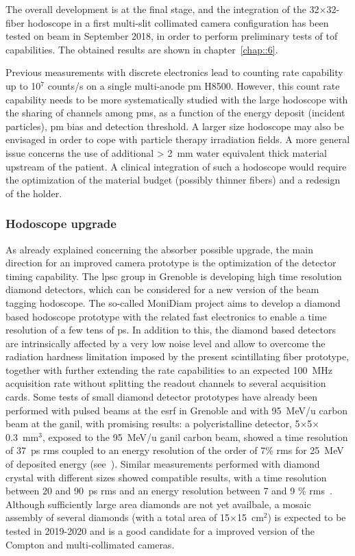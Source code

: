 The overall development is at the final stage, and the integration of the 32$\times$32-fiber hodoscope in a first multi-slit collimated camera configuration has been tested on beam in September 2018, in order to perform preliminary tests of \gls{tof} capabilities. The obtained results are shown in chapter~\ref{chap::6}.

Previous measurements with discrete electronics lead to counting rate capability up to 10$^7$ counts/s on a single multi-anode \gls{pm} H8500. However, this count rate capability needs to be more systematically studied with the large hodoscope with the sharing of channels among \glspl{pm}, as a function of the energy deposit (incident particles), \gls{pm} bias and detection threshold. A larger size hodoscope may also be envisaged in order to cope with particle therapy irradiation fields. A more general issue concerns the use of additional > 2~mm water equivalent thick material upstream of the patient. A clinical integration of such a hodoscope would require the optimization of the material budget (possibly thinner fibers) and a redesign of the holder.
 
\subsubsection{Hodoscope upgrade}\label{chap3::subsubsec::hodoUpgrade} 

As already explained concerning the absorber possible upgrade, the main direction for an improved camera prototype is the optimization of the detector timing capability. The \gls{lpsc} group in Grenoble is developing high time resolution diamond detectors, which can be considered for a new version of the beam tagging hodoscope. The so-called MoniDiam project aims to develop a diamond based hodoscope prototype with the related fast electronics to enable a time resolution of a few tens of ps. In addition to this, the diamond based detectors are intrinsically affected by a very low noise level and allow to overcome the radiation hardness limitation imposed by the present scintillating fiber prototype, together with further extending the rate capabilities to an expected 100~MHz acquisition rate without splitting the readout channels to several acquisition cards. Some tests of small diamond detector prototypes have already been performed with pulsed beams at the \gls{esrf} in Grenoble and with 95~MeV/u carbon beam at the \gls{ganil}, with promising results: a polycristalline detector, 5$\times$5$\times$0.3~mm$^3$, exposed to the 95~MeV/u \gls{ganil} carbon beam, showed a time resolution of 37~ps \gls{rms} coupled to an energy resolution of the order of 7\% \gls{rms} for 25~MeV of deposited energy (see~\cite{Gallin-Martel2016}). Similar measurements performed with diamond crystal with different sizes showed compatible results, with a time resolution between 20 and 90~ps \gls{rms} and an energy resolution between 7 and 9 \% \gls{rms}~\parencite{Gallin-Martel2018}. Although sufficiently large area diamonds are not yet availbale, a mosaic assembly of several diamonds (with a total area of 15$\times$15~cm$^{2}$) is expected to be tested in 2019-2020 and is a good candidate for a improved version of the Compton and multi-collimated cameras.

